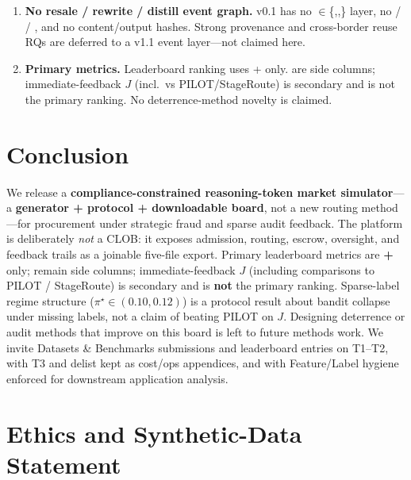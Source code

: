\documentclass[sigconf,review]{acmart}
\newcommand{\pistar}{\pi^\star}
\begin{document}
\begin{enumerate}
\item \textbf{No resale / rewrite / distill event graph.} v0.1 has no $\in$\{,,\} layer, no  /  / , and no content/output hashes. Strong provenance and cross-border reuse RQs are deferred to a v1.1 event layer---not claimed here.
\item \textbf{Primary metrics.} Leaderboard ranking uses  +  only.  are side columns; immediate-feedback $J$ (incl.\ vs PILOT/StageRoute) is secondary and is not the primary ranking. No deterrence-method novelty is claimed.
\end{enumerate}

\section{Conclusion}
\label{sec:conclusion}

We release a \textbf{compliance-constrained reasoning-token market simulator}---a \textbf{generator + protocol + downloadable board}, not a new routing method---for procurement under strategic fraud and sparse audit feedback. The platform is deliberately \emph{not} a CLOB: it exposes admission, routing, escrow, oversight, and feedback trails as a joinable five-file export. Primary leaderboard metrics are \textbf{ + } only;  remain side columns; immediate-feedback $J$ (including comparisons to PILOT / StageRoute) is secondary and is \textbf{not} the primary ranking. Sparse-label regime structure ($\pistar \in (0.10, 0.12)$) is a protocol result about bandit collapse under missing labels, not a claim of beating PILOT on $J$. Designing deterrence or audit methods that improve on this board is left to future methods work. We invite Datasets \& Benchmarks submissions and leaderboard entries on T1--T2, with T3 and delist kept as cost/ops appendices, and with Feature/Label hygiene enforced for downstream application analysis.

\section*{Ethics and Synthetic-Data Statement}
\label{sec:ethics}
\end{document}
